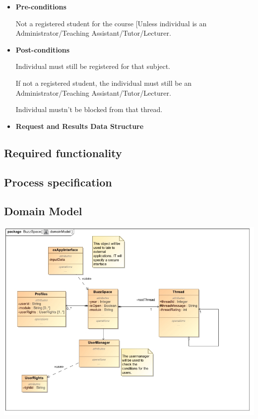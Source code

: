 \documentclass[a4paper,12pt]{report}
\begin{document}
\begin{itemize}
    \item\textbf{Pre-conditions}

	{Not a registered student for the course [Unless individual is an Administrator/Teaching Assistant/Tutor/Lecturer.}

    \item\textbf{Post-conditions }

	{Individual must still be registered for that subject.}

	{If not a registered student, the individual must still be an Administrator/Teaching Assistant/Tutor/Lecturer.}

	{Individual mustn't be blocked from that thread.}


    \item\textbf{Request and Results Data Structure} 

\end{itemize}

\subsection{Required functionality}

\subsection{Process specification}
\subsection{Domain Model}
	\begin{center}
  	\includegraphics[width=1\textwidth]		{../Functional_Requirements_DIagrams/DomainModel/DomainModel.jpg}\\[0.4cm]    
	\end{center}
\newpage


{} %

\end{document}
